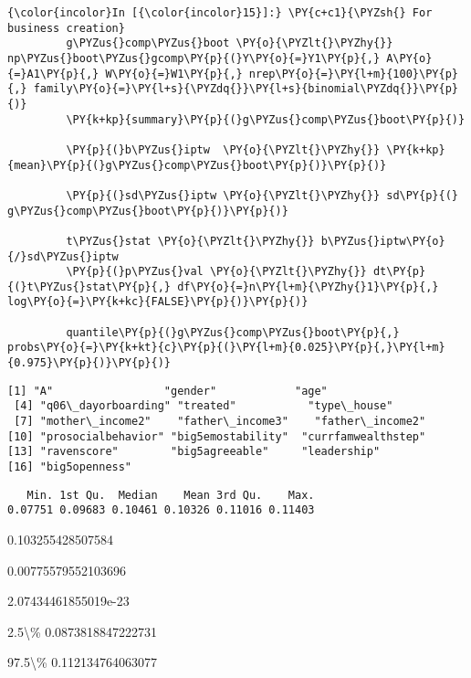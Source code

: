    \begin{Verbatim}[commandchars=\\\{\}]
{\color{incolor}In [{\color{incolor}15}]:} \PY{c+c1}{\PYZsh{} For business creation}
         g\PYZus{}comp\PYZus{}boot \PY{o}{\PYZlt{}\PYZhy{}} np\PYZus{}boot\PYZus{}gcomp\PY{p}{(}Y\PY{o}{=}Y1\PY{p}{,} A\PY{o}{=}A1\PY{p}{,} W\PY{o}{=}W1\PY{p}{,} nrep\PY{o}{=}\PY{l+m}{100}\PY{p}{,} family\PY{o}{=}\PY{l+s}{\PYZdq{}}\PY{l+s}{binomial\PYZdq{}}\PY{p}{)}
         \PY{k+kp}{summary}\PY{p}{(}g\PYZus{}comp\PYZus{}boot\PY{p}{)}
         
         \PY{p}{(}b\PYZus{}iptw  \PY{o}{\PYZlt{}\PYZhy{}} \PY{k+kp}{mean}\PY{p}{(}g\PYZus{}comp\PYZus{}boot\PY{p}{)}\PY{p}{)}
         
         \PY{p}{(}sd\PYZus{}iptw \PY{o}{\PYZlt{}\PYZhy{}} sd\PY{p}{(}  g\PYZus{}comp\PYZus{}boot\PY{p}{)}\PY{p}{)}
         
         t\PYZus{}stat \PY{o}{\PYZlt{}\PYZhy{}} b\PYZus{}iptw\PY{o}{/}sd\PYZus{}iptw
         \PY{p}{(}p\PYZus{}val \PY{o}{\PYZlt{}\PYZhy{}} dt\PY{p}{(}t\PYZus{}stat\PY{p}{,} df\PY{o}{=}n\PY{l+m}{\PYZhy{}1}\PY{p}{,} log\PY{o}{=}\PY{k+kc}{FALSE}\PY{p}{)}\PY{p}{)}
         
         quantile\PY{p}{(}g\PYZus{}comp\PYZus{}boot\PY{p}{,} probs\PY{o}{=}\PY{k+kt}{c}\PY{p}{(}\PY{l+m}{0.025}\PY{p}{,}\PY{l+m}{0.975}\PY{p}{)}\PY{p}{)}
\end{Verbatim}


    \begin{Verbatim}[commandchars=\\\{\}]
 [1] "A"                 "gender"            "age"              
 [4] "q06\_dayorboarding" "treated"           "type\_house"       
 [7] "mother\_income2"    "father\_income3"    "father\_income2"   
[10] "prosocialbehavior" "big5emostability"  "currfamwealthstep"
[13] "ravenscore"        "big5agreeable"     "leadership"       
[16] "big5openness"     

    \end{Verbatim}

    
    \begin{verbatim}
   Min. 1st Qu.  Median    Mean 3rd Qu.    Max. 
0.07751 0.09683 0.10461 0.10326 0.11016 0.11403 
    \end{verbatim}

    
    0.103255428507584

    
    0.00775579552103696

    
    2.07434461855019e-23

    
    \begin{description*}
\item[2.5\textbackslash{}\%] 0.0873818847222731
\item[97.5\textbackslash{}\%] 0.112134764063077
\end{description*}

